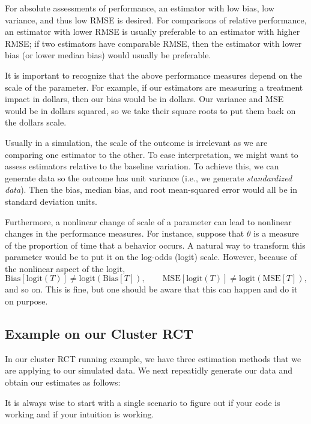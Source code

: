 \documentclass[
]{book}
\begin{document}
For absolute assessments of performance, an estimator with low bias, low variance, and thus low RMSE is desired.
For comparisons of relative performance, an estimator with lower RMSE is usually preferable to an estimator with higher RMSE; if two estimators have comparable RMSE, then the estimator with lower bias (or lower median bias) would usually be preferable.

It is important to recognize that the above performance measures depend on the scale of the parameter.
For example, if our estimators are measuring a treatment impact in dollars, then our bias would be in dollars.
Our variance and MSE would be in dollars squared, so we take their square roots to put them back on the dollars scale.

Usually in a simulation, the scale of the outcome is irrelevant as we are comparing one estimator to the other.
To ease interpretation, we might want to assess estimators relative to the baseline variation.
To achieve this, we can generate data so the outcome has unit variance (i.e., we generate \emph{standardized data}).
Then the bias, median bias, and root mean-squared error would all be in standard deviation units.

Furthermore, a nonlinear change of scale of a parameter can lead to nonlinear changes in the performance measures.
For instance, suppose that \(\theta\) is a measure of the proportion of time that a behavior occurs.
A natural way to transform this parameter would be to put it on the log-odds (logit) scale.
However, because of the nonlinear aspect of the logit,
\[\text{Bias}\left[\text{logit}(T)\right] \neq \text{logit}\left(\text{Bias}[T]\right), \qquad \text{MSE}\left[\text{logit}(T)\right] \neq \text{logit}\left(\text{MSE}[T]\right),\]
and so on.
This is fine, but one should be aware that this can happen and do it on purpose.

\hypertarget{example-on-our-cluster-rct}{%
\subsection{Example on our Cluster RCT}\label{example-on-our-cluster-rct}}

In our cluster RCT running example, we have three estimation methods that we are applying to our simulated data.
We next repeatidly generate our data and obtain our estimates as follows:

It is always wise to start with a single scenario to figure out if your code is working and if your intuition is working.
\end{document}
